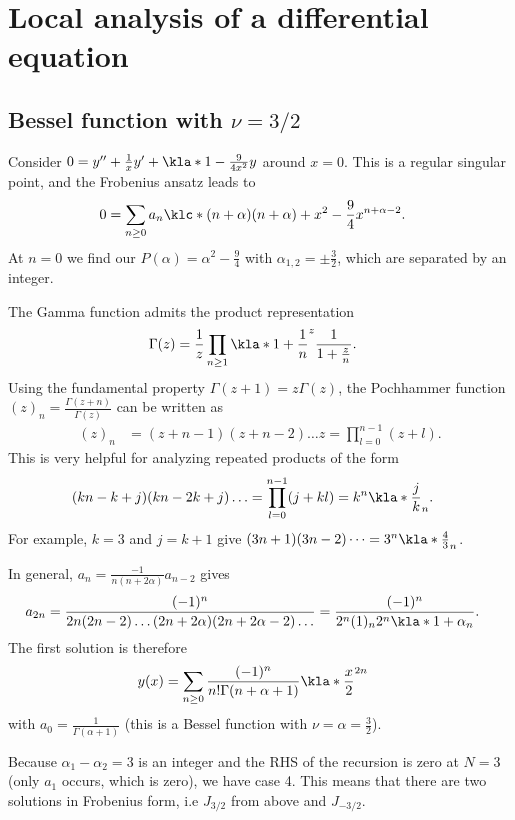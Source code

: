 \documentclass[english, parskip=full]{scrartcl}
\newcommand{\note}[1]{\begin{tcolorbox}[colback=colorbackgroundnote,colframe=colornote, breakable,enhanced]#1\end{tcolorbox}}
\begin{document}
\section{Local analysis of a differential equation}
\subsection{Bessel function with $\nu=3/2$}
Consider $0=y'' + \frac{1}{x}y' + \kla*{1 - \frac{9}{4x^2}}y$ around $x=0$.
This is a regular singular point, and the Frobenius ansatz leads to
\begin{align}
0 &= \sum_{n\ge 0} a_n \klc*{(n+\alpha)(n+\alpha) + x^2 - \frac{9}{4}} x^{n+\alpha-2}.
\end{align}
At $n=0$ we find our $P(\alpha)=\alpha^2 - \frac{9}{4}$ with $\alpha_{1,2} = \pm \frac{3}{2}$, which are separated by an integer.
\note{The Gamma function admits the product representation
\begin{align}
\Gamma(z) &= \frac{1}{z} \prod_{n\ge 1} \kla*{1 + \frac{1}{n}}^z \frac{1}{1+\frac{z}{n}}.
\end{align}
Using the fundamental property $\Gamma(z+1)=z\Gamma(z)$, the Pochhammer function $(z)_n = \frac{\Gamma(z+n)}{\Gamma(z)}$ can be written as
\begin{align}
(z)_n &= (z+n-1)(z+n-2) \dots z = \prod_{l=0}^{n-1} (z+l).
\end{align}
This is very helpful for analyzing repeated products of the form
\begin{align}
(kn-k+j)(kn-2k+j)\dots &= \prod_{l=0}^{n-1} (j+kl) = k^n \kla*{\frac{j}{k}}_n.
\end{align}
For example, $k=3$ and $j=k+1$ give $(3n+1)(3n-2)\dots = 3^n \kla*{\frac{4}{3}}_n$.
}
In general, $a_n = \frac{-1}{n(n + 2\alpha)} a_{n-2}$ gives
\begin{align}
a_{2n} &= \frac{(-1)^n}{2n(2n-2)\dots (2n+2\alpha)(2n+2\alpha-2)\dots} = \frac{(-1)^n}{2^n (1)_n 2^n \kla*{1 + \alpha}_n}.
\end{align}
The first solution is therefore
\begin{align}
y(x) &= \sum_{n\ge 0} \frac{(-1)^n}{n! \Gamma(n+\alpha+1)} \kla*{\frac{x}{2}}^{2n}
\end{align}
with $a_0 = \frac{1}{\Gamma(\alpha+1)}$ (this is a Bessel function with $\nu=\alpha=\frac{3}{2}$).

Because $\alpha_1 - \alpha_2 = 3$ is an integer and the RHS of the recursion is zero at $N=3$ (only $a_1$ occurs, which is zero), we have case 4.
This means that there are two solutions in Frobenius form, i.e $J_{3/2}$ from above and $J_{-3/2}$.
\end{document}

